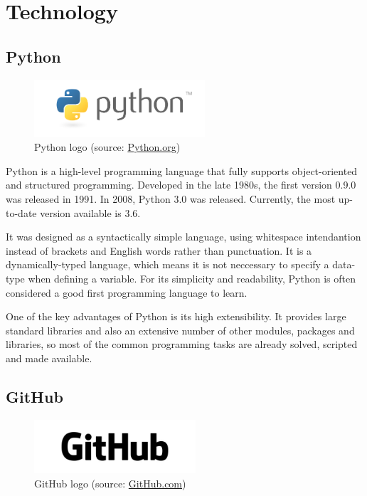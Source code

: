 \chapter{Technology}
\label{3-technologie}


\section{Python}

\begin{figure}[H] \centering
      \includegraphics[width=180pt]{./pictures/python-logo-master-v3-TM.png}
      \caption[Python logo]{Python logo (source:
\href{https://www.python.org/static/community_logos/python-logo-master-v3-TM.png}{Python.org})}
      \label{fig:python}
  \end{figure}

Python is a high-level programming language that fully supports object-oriented and structured programming. Developed in the late 1980s, the first version 0.9.0 was released in 1991. In 2008, Python 3.0 was released. Currently, the most up-to-date version available is 3.6.\cite{diveintopython}

It was designed as a syntactically simple language, using whitespace intendantion instead of brackets and English words rather than punctuation. It is a dynamically-typed language, which means it is not neccessary to specify a data-type when defining a variable. For its simplicity and readability, Python is often considered a good first programming language to learn.

One of the key advantages of Python is its high extensibility. It provides large standard libraries and also an extensive number of other modules, packages and libraries, so most of the common programming tasks are already solved, scripted and made available.



\section{GitHub}

\begin{figure}[H] \centering
      \includegraphics[width=170pt]{./pictures/github.png}
      \caption[GitHub logo]{GitHub logo (source:
\href{GitHub}{GitHub.com})}
      \label{fig:GitHub}
  \end{figure}

